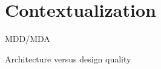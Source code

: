 \section{Contextualization}
\label{sect:contextualization}

MDD/MDA

Architecture versus design quality